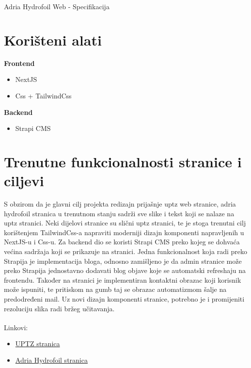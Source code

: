 \documentclass[12pt,a4paper]{article}
\begin{document}
	\begin{center}
		{\Huge Adria Hydrofoil Web - Specifikacija}
	\end{center}
	
	\section{Korišteni alati}
	
	\par{
		\textbf{Frontend}
		\begin{itemize}
			\item NextJS
			\item Css + TailwindCss
		\end{itemize}
	}
	\par{
		\textbf{Backend}
		\begin{itemize}
			\item Strapi CMS
		\end{itemize}
	}
	
	\section{Trenutne funkcionalnosti stranice i ciljevi}
	
		\par{S obzirom da je glavni cilj projekta redizajn prijašnje uptz web stranice, adria hydrofoil stranica u trenutnom stanju sadrži sve slike i tekst koji se nalaze na uptz stranici. Neki dijelovi stranice su slični uptz stranici, te je stoga trenutni cilj korištenjem TailwindCss-a napraviti moderniji dizajn komponenti napravljenih u NextJS-u i Css-u. Za backend dio se koristi Strapi CMS preko kojeg se dohvaća većina sadržaja koji se prikazuje na stranici. Jedna funkcionalnost koja radi preko Strapija je implementacija bloga, odnosno zamišljeno je da admin stranice može preko Strapija jednostavno dodavati blog objave koje se automatski refreshaju na frontendu. Također na stranici je implementiran kontaktni obrazac koji korisnik može ispuniti, te pritiskom na gumb taj se obrazac automatizmom šalje na predodređeni mail. Uz novi dizajn komponenti stranice, potrebno je i promijeniti rezoluciju slika radi bržeg učitavanja.}
		\\
		\\
		{\large Linkovi:}
		\begin{itemize}
			\item \href{https://uptz.hr/}{UPTZ stranica}
			\item \href{https://hydrofoil-web-nextjs.vercel.app/}{Adria Hydrofoil stranica}
		\end{itemize}
		
	
\end{document}
